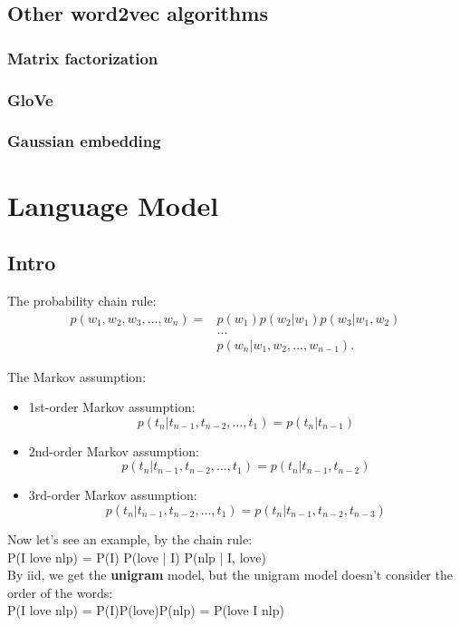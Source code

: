 \documentclass{report}
\begin{document}
\section{Other word2vec algorithms}
\subsection{Matrix factorization}
\subsection{GloVe}
\subsection{Gaussian embedding}

\chapter{Language Model}
\section{Intro}
\noindent The probability chain rule: \\
\begin{align*}
	p(w_1, w_2, w_3, \ldots, w_n) = &p (w_1) p(w_2 | w_1) p(w_3 | w_1, w_2)  \\ & \ldots \\ & p(w_n | w_1, w_2,\ldots,w_{n-1})
.\end{align*}

\noindent The Markov assumption:
\begin{itemize}
	\item 1st-order Markov assumption: \[
			p(t_n | t_{n-1}, t_{n-2}, \ldots, t_1) = p(t_n | t_{n-1})
	\] 
	\item 2nd-order Markov assumption: \[
			p(t_n | t_{n-1}, t_{n-2}, \ldots, t_1) = p(t_n | t_{n-1}, t_{n-2})
	\] 
	\item 3rd-order Markov assumption: \[
			p(t_n | t_{n-1}, t_{n-2}, \ldots, t_1) = p(t_n | t_{n-1}, t_{n-2}, t_{n-3})
	\] 
\end{itemize}

\noindent Now let's see an example, by the chain rule:\\
\linebreak
	P(I love nlp) = P(I) P(love | I) P(nlp | I, love)\\
	\linebreak
	By iid, we get the \textbf{unigram} model, but the unigram model doesn't consider the order of the words:\\
{\center
P(I love nlp) = P(I)P(love)P(nlp)} = P(love I nlp)\\
\end{document}
